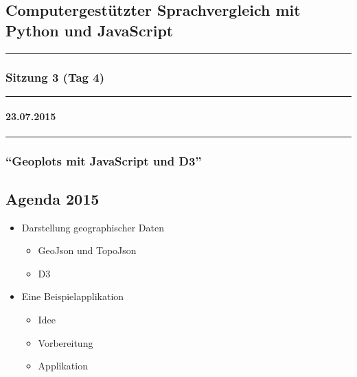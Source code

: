 
\subsection{Computergestützter Sprachvergleich mit Python und
JavaScript}

\begin{center}\rule{0.5\linewidth}{\linethickness}\end{center}

\subsubsection{Sitzung 3 (Tag 4)}

\begin{center}\rule{0.5\linewidth}{\linethickness}\end{center}

\paragraph{23.07.2015}

\begin{center}\rule{0.5\linewidth}{\linethickness}\end{center}

\subsubsection{\texorpdfstring{``Geoplots mit JavaScript und
D3''}{Geoplots mit JavaScript und D3}}

\subsection{\texorpdfstring{{Agenda 2015}}{Agenda 2015}}

\begin{itemize}
\itemsep1pt\parskip0pt
\item
  {Darstellung geographischer Daten}

  \begin{itemize}
  \itemsep1pt\parskip0pt
  \item
    {GeoJson und TopoJson}
  \item
    {D3}
  \end{itemize}
\item
  {Eine Beispielapplikation}

  \begin{itemize}
  \itemsep1pt\parskip0pt
  \item
    {Idee}
  \item
    {Vorbereitung}
  \item
    {Applikation}
  \end{itemize}
\end{itemize}

